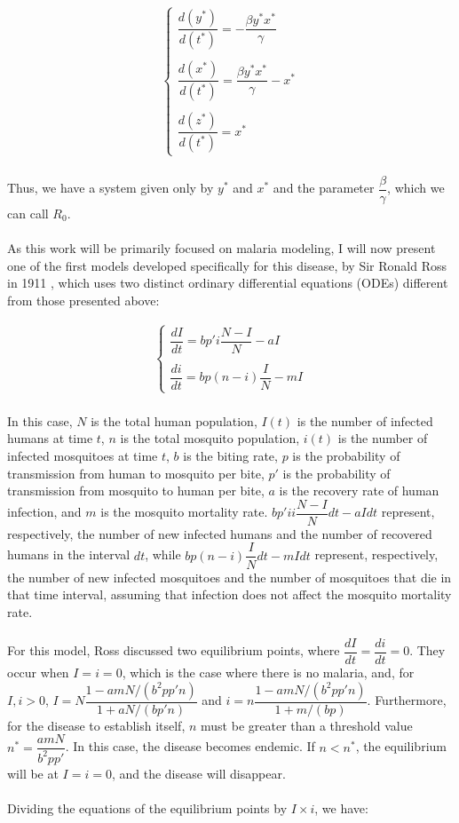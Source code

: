 \begin{gather*}
\begin{cases}
\dfrac{d(y^*)}{d(t^*)} = -\dfrac{\beta y^*x^*}{\gamma} \\
\\
\dfrac{d(x^*)}{d(t^*)} = \dfrac{\beta y^*x^*}{\gamma} - x^* \\
\\
\dfrac{d(z^*)}{d(t^*)} = x^*
\end{cases}
\end{gather*}
\\
Thus, we have a system given only by $y^*$ and $x^*$ and the 
parameter $\dfrac{\beta}{\gamma}$, which we can call $R_0$.
\\\\
As this work will be primarily focused on malaria modeling, 
I will now present one of the first models developed specifically 
for this disease, by Sir Ronald Ross in 1911 \cite{Bacaër2011}, 
which uses two distinct ordinary differential equations (ODEs) 
different from those presented above:

\begin{gather*}
\begin{cases}
\dfrac{dI}{dt} = bp'i\dfrac{N-I}{N} -aI\\
\\
\dfrac{di}{dt} = bp(n-i)\dfrac{I}{N} - mI
\end{cases}
\end{gather*}
\\
In this case, $N$ is the total human population, $I(t)$ is the number 
of infected humans at time $t$, $n$ is the total mosquito population, 
$i(t)$ is the number of infected mosquitoes at time $t$, $b$ is the 
biting rate, $p$ is the probability of transmission from human to 
mosquito per bite, $p'$ is the probability of transmission from 
mosquito to human per bite, $a$ is the recovery rate of human infection, 
and $m$ is the mosquito mortality rate. $bp'ii\dfrac{N-I}{N}dt -aIdt$ 
represent, respectively, the number of new infected humans and 
the number of recovered humans in the interval $dt$, while 
$bp(n-i)\dfrac{I}{N}dt - mIdt$ represent, respectively, the 
number of new infected mosquitoes and the number of mosquitoes that 
die in that time interval, assuming that infection does not affect 
the mosquito mortality rate.
\\\\
For this model, Ross discussed two equilibrium points, where 
$\dfrac{dI}{dt} = \dfrac{di}{dt} = 0$. They occur when $I=i=0$, 
which is the case where there is no malaria, and, for $I, i > 0$, 
$I = N\dfrac{1-amN/(b^2pp'n)}{1+aN/(bp'n)}$ and 
$i = n\dfrac{1-amN/(b^2pp'n)}{1+m/(bp)}$. Furthermore, for the 
disease to establish itself, $n$ must be greater than a 
threshold value $n^* = \dfrac{amN}{b^2pp'}$. In this case, 
the disease becomes endemic. If $n<n^*$, the equilibrium will 
be at $I=i=0$, and the disease will disappear.
\\\\
Dividing the equations of the equilibrium points by $I \times i$, we have:

